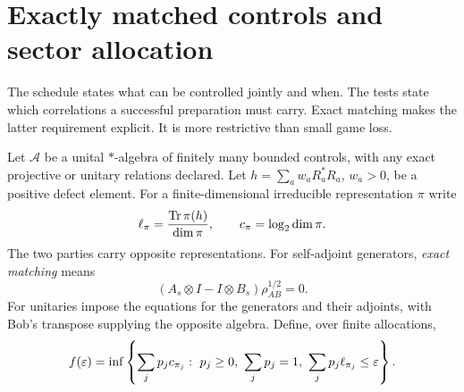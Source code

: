 \section{Exactly matched controls and sector allocation}\label{sec:sectors}
The schedule states what can be controlled jointly and when. The tests state which correlations a successful preparation must carry. Exact matching makes the latter requirement explicit. It is more restrictive than small game loss.

Let $\mathcal A$ be a unital $*$-algebra of finitely many bounded controls, with any exact projective or unitary relations declared. Let $h=\sum_aw_aR_a^*R_a$, $w_a>0$, be a positive defect element. For a finite-dimensional irreducible representation $\pi$ write
\[
 \ell_\pi=\frac{\operatorname{Tr}\pi(h)}{\dim\pi},\qquad c_\pi=\log_2\dim\pi.
\]
The two parties carry opposite representations. For self-adjoint generators, \emph{exact matching} means
\begin{equation}
 (A_s\otimes I-I\otimes B_s)\rho_{AB}^{1/2}=0.\label{eq:match}
\end{equation}
For unitaries impose the equations for the generators and their adjoints, with Bob's transpose supplying the opposite algebra. Define, over finite allocations,
\begin{equation}
 f(\eps)=\inf\left\{\sum_jp_jc_{\pi_j}:\ p_j\ge0,\ \sum_jp_j=1,
                       \ \sum_jp_j\ell_{\pi_j}\le\eps\right\}.\label{eq:sectorlp}
\end{equation}


